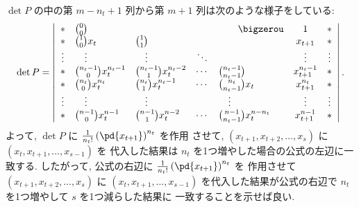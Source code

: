\documentclass[12pt,twoside]{jarticle}
\begin{document}
$\det P$ の中の第 $m-n_t+1$ 列から第 $m+1$ 列は次のような様子をしている:
\begin{equation*}
  \det P = 
  \left|
  \begin{array}{cllclcc}
    *      & \binom{0}{0}     &              &  & \qquad\bigzerou & 1       & * \\
    *      & \binom{1}{0} x_t & \binom{1}{1} &        &           & x_{t+1} & * \\
    \vdots & \quad\vdots      & \quad\vdots  & \ddots &           & \vdots  & \vdots \\
    *      & \binom{n_t-1}{0} x_t^{n_t-1} & \binom{n_t-1}{1} x_t^{n_t-2} & \cdots & \binom{n_t-1}{n_t-1}           & x_{t+1}^{n_t-1} & * \\
    *      & \binom{n_t}{0} x_t^{n_t}     & \binom{n_t}{1} x_t^{n_t-1}   & \cdots & \binom{n_t}{n_t-1} x_t         & x_{t+1}^{n_t}   & * \\
    \vdots & \quad\vdots                  & \quad\vdots                  &        & \quad\vdots                    & \vdots          & \vdots \\
    *      & \binom{n-1}{0} x_t^{n-1}     & \binom{n-1}{1} x_t^{n-2}     & \cdots & \binom{n-1}{n_t-1} x_t^{n-n_t} & x_{t+1}^{n-1}   & * \\
  \end{array}
  \right|.
\end{equation*}
よって, $\det P$ に $\frac{1}{n_t!}\left(\pd{x_{t+1}}\right)^{n_t}$ を作用
させて, $(x_{t+1},x_{t+2},\dots,x_s)$ に $(x_t,x_{t+1},\dots,x_{s-1})$ を
代入した結果は $n_t$ を1つ増やした場合の公式の左辺に一致する. したがって, 
公式の右辺に $\frac{1}{n_t!}\left(\pd{x_{t+1}}\right)^{n_t}$ を
作用させて $(x_{t+1},x_{t+2},\dots,x_s)$ に $(x_t,x_{t+1},\dots,x_{s-1})$ 
を代入した結果が公式の右辺で $n_t$ を1つ増やして $s$ を1つ減らした結果に
一致することを示せば良い.  
\end{document}
